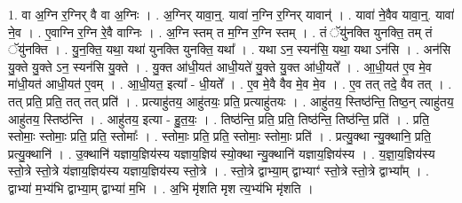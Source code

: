 \documentclass[17pt]{extarticle}
\begin{document}
1. वा अ॒ग्नि र॒ग्निर् वै वा अ॒ग्निः । . अ॒ग्निर् यावा॒न्॒. यावा॑ न॒ग्नि र॒ग्निर् यावान्॑ । . यावा॑ ने॒वैव यावा॒न्॒. यावा॑ ने॒व । . ए॒वाग्नि र॒ग्नि रे॒वै वाग्निः । . अ॒ग्नि स्तम् त म॒ग्नि र॒ग्नि स्तम् । . तं ॅयु॑नक्ति युनक्ति॒ तम् तं ॅयु॑नक्ति । . यु॒न॒क्ति॒ यथा॒ यथा॑ युनक्ति युनक्ति॒ यथा᳚ । . यथा ऽन॒ स्यन॑सि॒ यथा॒ यथा ऽन॑सि । . अन॑सि यु॒क्ते यु॒क्ते ऽन॒ स्यन॑सि यु॒क्ते । . यु॒क्त आ॑धी॒यत॑ आधी॒यते॑ यु॒क्ते यु॒क्त आ॑धी॒यते᳚ । . आ॒धी॒यत॑ ए॒व मे॒व मा॑धी॒यत॑ आधी॒यत॑ ए॒वम् । . आ॒धी॒यत॒ इत्या᳚ - धी॒यते᳚ । . ए॒व मे॒वै वैव मे॒व मे॒व । . ए॒व तत् तदे॒ वैव तत् । . तत् प्रति॒ प्रति॒ तत् तत् प्रति॑ । . प्रत्याहु॑तय॒ आहु॑तयः॒ प्रति॒ प्रत्याहु॑तयः । . आहु॑तय॒ स्तिष्ठ॑न्ति॒ तिष्ठ॒न् त्याहु॑तय॒ आहु॑तय॒ स्तिष्ठ॑न्ति । . आहु॑तय॒ इत्या - हु॒त॒यः॒ । . तिष्ठ॑न्ति॒ प्रति॒ प्रति॒ तिष्ठ॑न्ति॒ तिष्ठ॑न्ति॒ प्रति॑ । . प्रति॒ स्तोमाः॒ स्तोमाः॒ प्रति॒ प्रति॒ स्तोमाः᳚ । . स्तोमाः॒ प्रति॒ प्रति॒ स्तोमाः॒ स्तोमाः॒ प्रति॑ । . प्रत्यु॒क्था न्यु॒क्थानि॒ प्रति॒ प्रत्यु॒क्थानि॑ । . उ॒क्थानि॑ यज्ञाय॒ज्ञिय॑स्य यज्ञाय॒ज्ञिय॑ स्यो॒क्था न्यु॒क्थानि॑ यज्ञाय॒ज्ञिय॑स्य । . य॒ज्ञा॒य॒ज्ञिय॑स्य स्तो॒त्रे स्तो॒त्रे य॑ज्ञाय॒ज्ञिय॑स्य यज्ञाय॒ज्ञिय॑स्य स्तो॒त्रे । . स्तो॒त्रे द्वाभ्या॒म् द्वाभ्याꣳ॑ स्तो॒त्रे स्तो॒त्रे द्वाभ्या᳚म् । . द्वाभ्या॑ म॒भ्य॑भि द्वाभ्या॒म् द्वाभ्या॑ म॒भि । . अ॒भि मृ॑शति मृश त्य॒भ्य॑भि मृ॑शति । \newline
\end{document}
